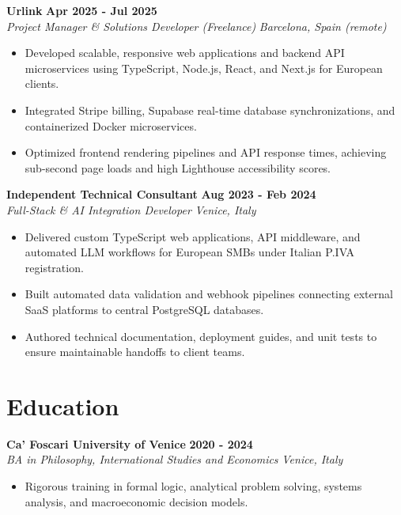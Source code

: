 \documentclass[10pt,a4paper]{article}
\newcommand{\role}[4]{%
  \textbf{#1} \hfill \textbf{#2}\\[1pt]%
  \textit{#3} \hfill \textit{#4}\\[2pt]%
}
\begin{document}
\role{Urlink}{Apr 2025 - Jul 2025}{Project Manager \& Solutions Developer (Freelance)}{Barcelona, Spain (remote)}
\begin{itemize}
  \item Developed scalable, responsive web applications and backend API microservices using TypeScript, Node.js, React, and Next.js for European clients.
  \item Integrated Stripe billing, Supabase real-time database synchronizations, and containerized Docker microservices.
  \item Optimized frontend rendering pipelines and API response times, achieving sub-second page loads and high Lighthouse accessibility scores.
\end{itemize}

\role{Independent Technical Consultant}{Aug 2023 - Feb 2024}{Full-Stack \& AI Integration Developer}{Venice, Italy}
\begin{itemize}
  \item Delivered custom TypeScript web applications, API middleware, and automated LLM workflows for European SMBs under Italian P.IVA registration.
  \item Built automated data validation and webhook pipelines connecting external SaaS platforms to central PostgreSQL databases.
  \item Authored technical documentation, deployment guides, and unit tests to ensure maintainable handoffs to client teams.
\end{itemize}

\section{Education}
\role{Ca' Foscari University of Venice}{2020 - 2024}{BA in Philosophy, International Studies and Economics}{Venice, Italy}
\begin{itemize}
  \item Rigorous training in formal logic, analytical problem solving, systems analysis, and macroeconomic decision models.
\end{itemize}
\end{document}
